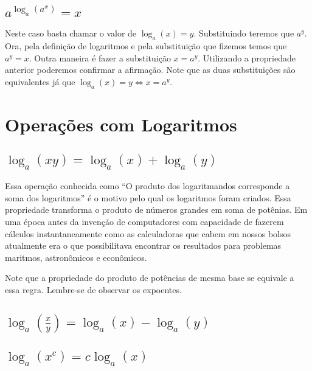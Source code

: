 \subsection{$a^{\log_a (a^x)}=x$}

Neste caso basta chamar o valor de $\log_a (x)=y$. Substituindo teremos que $a^y$. Ora, pela definição de logaritmos e pela substituição que fizemos temos que $a^y=x$. Outra maneira é fazer a substituição $x=a^y$. Utilizando a propriedade anterior poderemos confirmar a afirmação. Note que as duas substituições são equivalentes já que $\log_a (x)=y \Longleftrightarrow x=a^y$.

\section{Operações com Logaritmos}

\subsection{$\log_a (xy)=\log_a (x)+\log_a (y)$}

Essa operação conhecida como ``O produto dos logaritmandos corresponde a soma dos logaritmos'' é o motivo pelo qual os logaritmos foram criados. Essa propriedade transforma o produto de números grandes em soma de potênias. Em uma época antes da invenção de computadores com capacidade de fazerem cálculos instantaneamente como as calculadoras que cabem em nossos bolsos atualmente era o que possibilitava encontrar os resultados para problemas maritmos, astronômicos e econômicos.

Note que a propriedade do produto de potências de mesma base se equivale a essa regra. Lembre-se de observar os expoentes.

\subsection{$\log_a (\frac{x}{y})=\log_a (x)-\log_a (y)$}

\subsection{$\log_a (x^c)=c\log_a (x)$}

